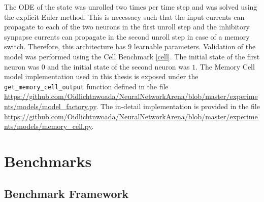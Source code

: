 \documentclass[draft,final]{vutinfth} %
\begin{document}
    The ODE of the state was unrolled two times per time step and was solved using the explicit Euler method.
    This is necessaey such that the input currents can propagate to each of the two neurons in the first unroll step and the inhibitory synpapse currents can propagate in the second unroll step in case of a memory switch.
    Therefore, this architecture has $9$ learnable parameters. 
    Validation of the model was performed using the Cell Benchmark \ref{cell}.
    The initial state of the first neuron was $0$ and the initial state of the second neuron was $1$.
    The Memory Cell model implementation used in this thesis is exposed under the \texttt{get\_memory\_cell\_output} function defined in the file \url{https://github.com/Oidlichtnwoada/NeuralNetworkArena/blob/master/experiments/models/model_factory.py}.
    The in-detail implementation is provided in the file \url{https://github.com/Oidlichtnwoada/NeuralNetworkArena/blob/master/experiments/models/memory_cell.py}.

    \chapter{Benchmarks}

    \section{Benchmark Framework}
\end{document}

